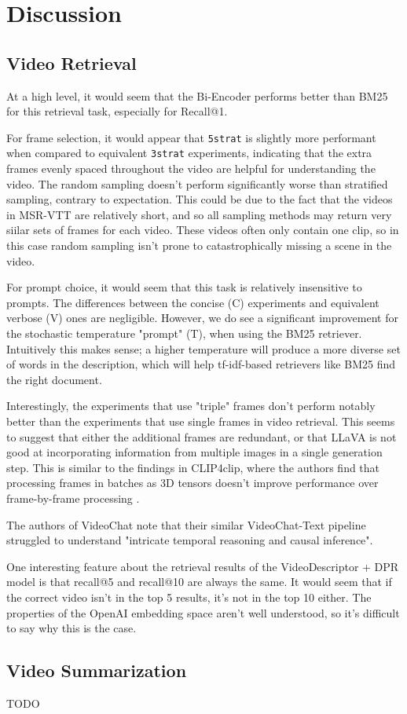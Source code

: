 \section{Discussion}

\subsection{Video Retrieval}

At a high level, it would seem that the Bi-Encoder performs better than BM25 for this retrieval task, especially for Recall@1.

For frame selection, it would appear that \verb|5strat| is slightly more performant when compared to equivalent \verb|3strat| experiments, indicating that the extra frames evenly spaced throughout the video are helpful for understanding the video.
The random sampling doesn't perform significantly worse than stratified sampling, contrary to expectation.
This could be due to the fact that the videos in MSR-VTT are relatively short, and so all sampling methods may return very siilar sets of frames for each video.
These videos often only contain one clip, so in this case random sampling isn't prone to catastrophically missing a scene in the video.

For prompt choice, it would seem that this task is relatively insensitive to prompts.
The differences between the concise (C) experiments and equivalent verbose (V) ones are negligible.
However, we do see a significant improvement for the stochastic temperature "prompt" (T), when using the BM25 retriever.
Intuitively this makes sense; a higher temperature will produce a more diverse set of words in the description, which will help tf-idf-based retrievers like BM25 find the right document.

Interestingly, the experiments that use "triple" frames don't perform notably better than the experiments that use single frames in video retrieval.
This seems to suggest that either the additional frames are redundant, or that LLaVA is not good at incorporating information from multiple images in a single generation step.
This is similar to the findings in CLIP4clip, where the authors find that processing frames in batches as 3D tensors doesn't improve performance over frame-by-frame processing \cite{clip4clip}.

The authors of VideoChat note that their similar VideoChat-Text pipeline struggled to understand "intricate temporal reasoning and causal inference".

One interesting feature about the retrieval results of the VideoDescriptor + DPR model is that recall@5 and recall@10 are always the same.
It would seem that if the correct video isn't in the top 5 results, it's not in the top 10 either.
The properties of the OpenAI embedding space aren't well understood, so it's difficult to say why this is the case.

\subsection{Video Summarization}

TODO
